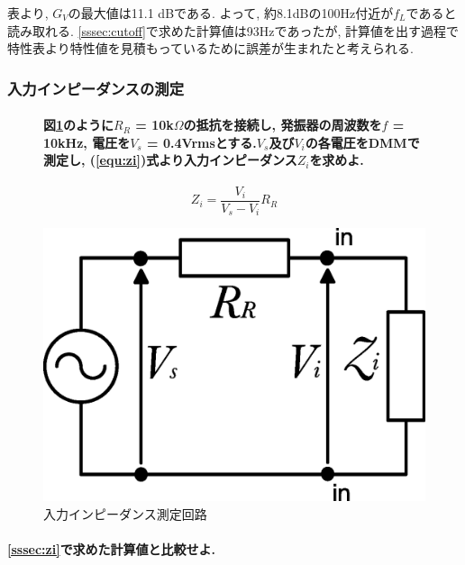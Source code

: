 \documentclass[titlepage]{jsarticle}
\begin{document}
                表より, $G_V$の最大値は11.1 dBである. よって, 約8.1dBの100Hz付近が$f_L$であると読み取れる.
                \ref{sssec:cutoff}で求めた計算値は93Hzであったが,
                計算値を出す過程で特性表より特性値を見積もっているために誤差が生まれたと考えられる.

        \subsubsection{入力インピーダンスの測定}
            \begin{figure}[H]
                \begin{minipage}{0.6\hsize}
                    \paragraph{図\ref{fig:tr_zi}のように$R_R$ = 10k$\Omega$の抵抗を接続し, 発振器の周波数を$f$ = 10kHz, 電圧を$V_s$ = 0.4Vrmsとする.$V_s$及び$V_i$の各電圧をDMMで測定し, (\ref{equ:zi})式より入力インピーダンス$Z_i$を求めよ.}
                    
                    \begin{equation}
                        Z_i = \frac{V_i}{V_s - V_i} R_R \label{equ:zi}
                    \end{equation}
                \end{minipage}
                \begin{minipage}{0.4\hsize}
                    \centering
                    \includegraphics[width=0.72\hsize]{images/tr_zi.eps}
                    \caption{入力インピーダンス測定回路}
                    \label{fig:tr_zi}
                \end{minipage}
            \end{figure}

            \paragraph{\ref{sssec:zi}で求めた計算値と比較せよ.}
            \mbox{} \\
\end{document}
